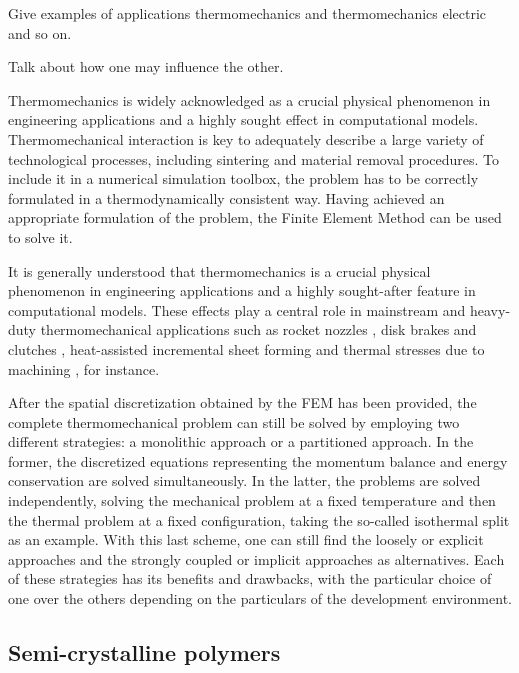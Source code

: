 Give examples of applications thermomechanics and thermomechanics electric and so on.

Talk about how one may influence the other.

Thermomechanics is widely acknowledged as a crucial physical phenomenon in engineering applications and a highly sought effect in computational models.
Thermomechanical interaction is key to adequately describe a large variety of technological processes, including sintering and material removal procedures.
To include it in a numerical simulation toolbox, the problem has to be correctly formulated in a thermodynamically consistent way.
Having achieved an appropriate formulation of the problem, the Finite Element Method can be used to solve it.

It is generally understood that thermomechanics is a crucial physical phenomenon in engineering applications and a highly sought-after feature in computational models.
These effects play a central role in mainstream and heavy-duty thermomechanical applications such as rocket nozzles \citep{kuhl2002ThermomechanicalAnalysisOptimization,danowski_monolithic_2013}, disk brakes and clutches \citep{yevtushenko2015NumericalAnalysisThermal}, heat-assisted incremental sheet forming \citep{liu2018HeatassistedIncrementalSheet} and thermal stresses due to machining \citep{elsheikh2021ComprehensiveReviewResidual}, for instance.

After the spatial discretization obtained by the FEM has been provided, the complete thermomechanical problem can still be solved by employing two different strategies: a monolithic approach or a partitioned approach.
In the former, the discretized equations representing the momentum balance and energy conservation are solved simultaneously.
In the latter, the problems are solved independently, solving the mechanical problem at a fixed temperature and then the thermal problem at a fixed configuration, taking the so-called isothermal split as an example.
With this last scheme, one can still find the loosely or explicit approaches and the strongly coupled or implicit approaches as alternatives.
Each of these strategies has its benefits and drawbacks, with the particular choice of one over the others depending on the particulars of the development environment.

\subsection{Semi-crystalline polymers}

